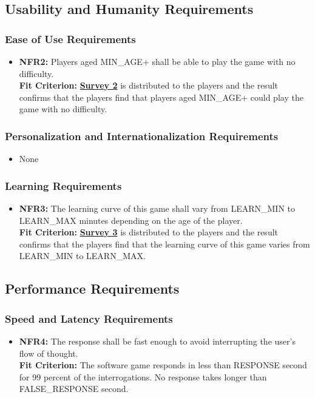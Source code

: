 \documentclass[12pt, titlepage]{article}
\begin{document}
\subsection{Usability and Humanity Requirements}
\subsubsection{Ease of Use Requirements}
\begin{itemize}
        \item \textbf{NFR2:} Players aged MIN\_AGE+ shall be able to play the game with no difficulty.\\
        \textbf{Fit Criterion:} \hyperref[s1]{\textbf{Survey 2}} is distributed to the players and the result confirms that the players find that players aged MIN\_AGE+ could play the game with no difficulty.
\end{itemize}
\subsubsection{Personalization and Internationalization Requirements}
\begin{itemize}
        \item None
\end{itemize}
\subsubsection{Learning Requirements}
\begin{itemize}
        \item \textbf{NFR3:} The learning curve of this game shall vary from LEARN\_MIN to LEARN\_MAX minutes depending on the age of the player.\\
        \textbf{Fit Criterion:} \hyperref[s1]{\textbf{Survey 3}} is distributed to the players and the result confirms that the players find that the learning curve of this game varies from LEARN\_MIN to LEARN\_MAX.
\end{itemize}
\subsection{Performance Requirements}
\subsubsection{Speed and Latency Requirements}
\begin{itemize}
        \item \textbf{NFR4:} The response shall be fast enough to avoid interrupting the user's flow of thought.\\
                    \textbf{Fit Criterion:} The software game responds in less than RESPONSE second for 99 percent of the interrogations. No response takes longer than FALSE\_RESPONSE second.
\end{itemize}
\end{document}
